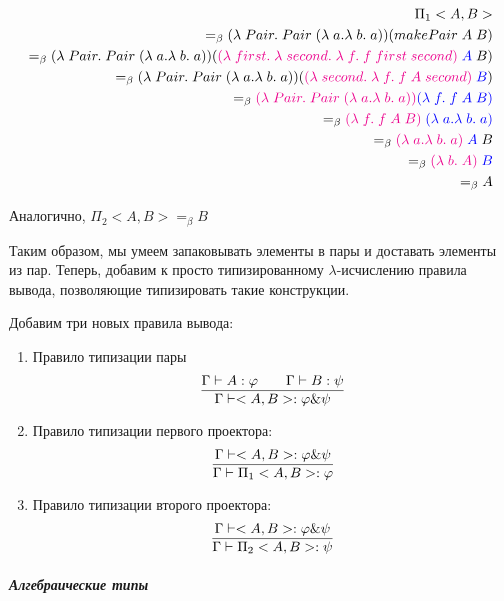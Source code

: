 \begin{align*}
	\Pi_1 <A, B> \\
	=_{\beta} (\lambda \; Pair. \; Pair \; (\lambda \; a. \lambda \; b. \; a)) (makePair \; A \; B)\\ =_\beta (\lambda \; Pair. \; Pair \; (\lambda \; a. \lambda \; b. \; a)) (\textcolor{magenta}{(\lambda \; first. \; \lambda \; second. \; \lambda \; f. \; f \; first \; second)} \; \textcolor{blue}{A} \; B) \\ =_\beta (\lambda \; Pair. \; Pair \; (\lambda \; a. \lambda \; b. \; a)) (\textcolor{magenta}{(\lambda \; second. \; \lambda \; f. \; f \; A \; second)} \; \textcolor{blue}{B}) \\ =_\beta \textcolor{magenta}{(\lambda \; Pair. \; Pair \; (\lambda \; a. \lambda \; b. \; a))} \textcolor{blue}{(\lambda \; f. \; f \; A \; B)} \\ =_\beta \textcolor{magenta}{(\lambda \; f. \; f \; A \; B)} \; \textcolor{blue}{(\lambda \; a. \lambda \; b. \; a)} \\ =_\beta \textcolor{magenta}{(\lambda \; a. \lambda \; b. \; a)} \; \textcolor{blue}{A} \; B \\ =_\beta \textcolor{magenta}{(\lambda \; b. \; A)} \; \textcolor{blue}{B} \\ =_\beta A
\end{align*}

Аналогично, $\Pi_2 <A, B> =_\beta B$

Таким образом, мы умеем запаковывать элементы в пары и доставать элементы из пар. Теперь, добавим к просто типизированному $\lambda$-исчислению правила вывода, позволяющие типизировать такие конструкции.

Добавим три новых правила вывода:

\begin{enumerate}
	\item Правило типизации пары
	\[
	\infer{\Gamma \vdash <A, B>: \varphi \text{\&} \psi}{\Gamma\vdash A: \varphi && \Gamma\vdash B: \psi}
	\]
	\item Правило типизации первого проектора:
	\[
	\infer{\Gamma \vdash \Pi_1 <A, B> : \varphi}{\Gamma \vdash <A, B>: \varphi \text{\&} \psi}
	\]
	
	\item Правило типизации второго проектора:
	\[
	\infer{\Gamma \vdash \Pi_2 <A, B> : \psi}{\Gamma \vdash <A, B>: \varphi \text{\&} \psi}
	\]
\end{enumerate}

\subparagraph{Алгебраические типы}

